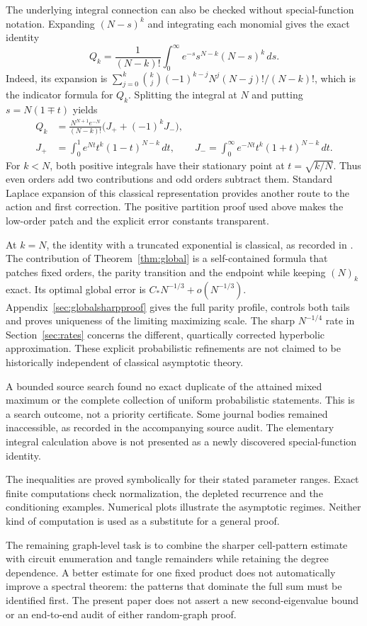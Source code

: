 The underlying integral connection can also be checked without special-function notation. Expanding $(N-s)^k$ and integrating each monomial gives the exact identity
\begin{equation}\label{eq:gammaidentity}
Q_k=\frac1{(N-k)!}\int_0^\infty
e^{-s}s^{N-k}(N-s)^k\,ds.
\end{equation}
Indeed, its expansion is
$\sum_{j=0}^k\binom kj(-1)^{k-j}N^j(N-j)!/(N-k)!$,
which is the indicator formula for $Q_k$. Splitting the integral at $N$ and putting $s=N(1\mp t)$ yields
\begin{align*}
Q_k&=\frac{N^{N+1}e^{-N}}{(N-k)!}
\bigl(J_++(-1)^kJ_-\bigr),\\
J_+&=\int_0^1 e^{Nt}t^k(1-t)^{N-k}\,dt,\qquad
J_-=\int_0^\infty e^{-Nt}t^k(1+t)^{N-k}\,dt.
\end{align*}
For $k<N$, both positive integrals have their stationary point at $t=\sqrt{k/N}$. Thus even orders add two contributions and odd orders subtract them. Standard Laplace expansion of this classical representation provides another route to the action and first correction. The positive partition proof used above makes the low-order patch and the explicit error constants transparent.

At $k=N$, the identity with a truncated exponential is classical, as recorded in \cite[Section 1]{DMO}. The contribution of Theorem~\ref{thm:global} is a self-contained formula that patches fixed orders, the parity transition and the endpoint while keeping $(N)_k$ exact. Its optimal global error is $C_*N^{-1/3}+o(N^{-1/3})$. Appendix~\ref{sec:globalsharpproof} gives the full parity profile, controls both tails and proves uniqueness of the limiting maximizing scale. The sharp $N^{-1/4}$ rate in Section~\ref{sec:rates} concerns the different, quartically corrected hyperbolic approximation. These explicit probabilistic refinements are not claimed to be historically independent of classical asymptotic theory.

A bounded source search found no exact duplicate of the attained mixed maximum or the complete collection of uniform probabilistic statements. This is a search outcome, not a priority certificate. Some journal bodies remained inaccessible, as recorded in the accompanying source audit. The elementary integral calculation above is not presented as a newly discovered special-function identity.

The inequalities are proved symbolically for their stated parameter ranges. Exact finite computations check normalization, the depleted recurrence and the conditioning examples. Numerical plots illustrate the asymptotic regimes. Neither kind of computation is used as a substitute for a general proof.

The remaining graph-level task is to combine the sharper cell-pattern estimate with circuit enumeration and tangle remainders while retaining the degree dependence. A better estimate for one fixed product does not automatically improve a spectral theorem: the patterns that dominate the full sum must be identified first. The present paper does not assert a new second-eigenvalue bound or an end-to-end audit of either random-graph proof.

